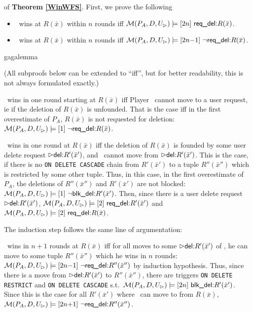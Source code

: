 \documentclass[twoside,11pt]{article}
\theoremstyle{lines}
\theoremstyle{longplain}
\def\rdel{\itorsf{req\_del:}}
\def\bdel{\itorsf{blk\_del:}}
\begin{document}
\begin{Proof} of \textbf{Theorem \ref{WinWFS}}.
First,  we  prove the following 
\begin{Lemma}\label{WinWFSAux}
  \begin{itemize}
  \item  \I\ wins  at  $R(\bar x)$ within $n$
    rounds iff $\pl M(P_A,D,U_\rhd) \models \sterm{2n}\ \rdel R(\bar
    x)$.
  \item \II\ wins at $R(\bar x)$ within $n$ rounds iff $\pl
    M(P_A,D,U_\rhd) \models \sterm{2n{-}1}\ \neg \rdel R(\bar x)$.
 \end{itemize}
 gagalemma
\end{Lemma}
\begin{Proof}
  (All subproofs below can be extended to ``iff'', but for better
  readability, this is not always formulated exactly.)  

   \II\ wins in one round starting at $R(\bar x)$ iff Player \I\ 
  cannot move to a user request, ie if the deletion of
  $R(\bar x)$ is unfounded. That is the case iff in the first
  overestimate of $P_A$, $R(\bar x)$ is not requested for deletion:
  $\pl M(P_A,D,U_\rhd) \models \sterm{1}\ \neg \rdel R(\bar x)$.

  \I\ wins in one round at $R(\bar x)$ iff the deletion of 
 $R(\bar x)$ is founded by some user delete request 
 $\extev \del R'(\bar x')$, and  \II\ cannot move from
 $\extev \del R'(\bar x')$. This is the case, if there is no \texttt{ON
   DELETE CASCADE} chain from $R'(\bar x')$ to a tuple $R''(\bar x'')$
 which is restricted by some other tuple.
 Thus, in this case, in the first overestimate of $P_A$, the
 deletions of $R''(\bar x'')$ and $R'(\bar x')$ are not blocked:
 $\pl M(P_A,D,U_\rhd) \models \sterm{1}\ \neg \bdel R'(\bar x')$.
 Then, since there is a user delete request $\extev \del R'(\bar x')$,
 $\pl M(P_A,D,U_\rhd) \models \sterm{2}\ \rdel R'(\bar x')$ and
 $\pl M(P_A,D,U_\rhd) \models \sterm{2}\ \rdel R(\bar x)$.

 The induction step follows the same line of argumentation: 
 
 \II\ wins in $n{+}1$ rounds at $R(\bar x)$ iff for all moves to some
 $\extev \del R'(\bar x')$ of \I, he can move to some tuple $R''(\bar
 x'')$ which he wins in $n$ rounds: $\pl M(P_A,D,U_\rhd) \models
 \sterm{2n{-}1}\ \neg \rdel R''(\bar x'')$ by induction hypothesis.
 Thus, since there is a move from $\extev \del R'(\bar x')$ to $R''(\bar x'')$,
 there are triggers \texttt{ON DELETE RESTRICT} and \texttt{ON DELETE
   CASCADE} s.t.\ $\pl M(P_A,D,U_\rhd) \models \sterm{2n}\ \bdel
 R'(\bar x')$.  Since this is the case for all $R'(\bar x')$ where \I\ 
 can move to from $R(\bar x)$, $\pl M(P_A,D,U_\rhd) \models
 \sterm{2n{+}1}\ \neg \rdel R''(\bar x'')$.


\end{Proof}
\end{Proof}
\end{document}
